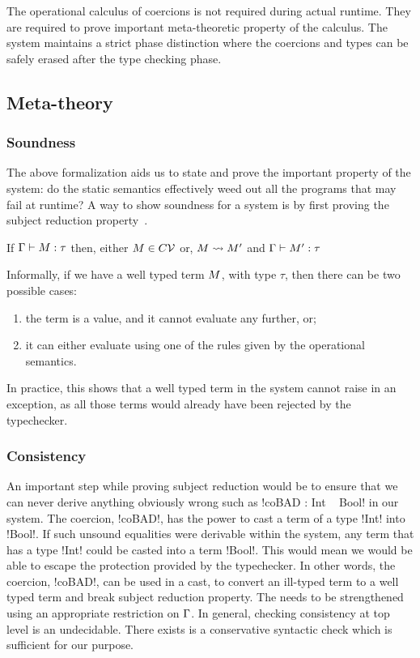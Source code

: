 \documentclass[screen,nonacm,manuscript,review]{acmart} %
\begin{document}
The operational calculus of coercions is not required during
actual runtime. They are required to prove important
meta-theoretic property of the calculus. The system maintains a strict
phase distinction where the coercions and types can be safely erased
after the type checking phase.

\subsection{Meta-theory}
\subsubsection{Soundness}
The above formalization aids us to state and prove
the important property of the system: do the static semantics
effectively weed out all the programs that may fail at runtime?
A way to show soundness for a system is by first proving the subject
reduction property~\cite{wright_syntactic_1994}.

\begin{claim}\label{claim:sfc-ty-safety}
 If $\Gamma \vdash M : \tau$ then, either $M \in C\mathcal{V}$ or, $M \rightsquigarrow M'$ and
 $\Gamma \vdash M' : \tau$
\end{claim}

Informally, if we have a well typed term $M$, with type $\tau$, then
there can be two possible cases:
\begin{enumerate}
\item the term is a value, and it cannot evaluate any further, or;
\item it can either evaluate using one of the rules given by the
  operational semantics.
\end{enumerate}
In practice, this shows that a well typed term in the system
cannot raise in an exception, as all those terms would already have
been rejected by the typechecker.

\subsubsection{Consistency}
An important step while proving subject reduction would be to ensure that we
can never derive anything obviously wrong such as !coBAD : Int ~ Bool!
in our system. The coercion, !coBAD!, has the power to cast a term of
a type !Int! into !Bool!. If such unsound equalities were
derivable within the system, any term that has a type !Int! could be
casted into a term !Bool!. This would mean we would be able to escape
the protection provided by the typechecker. In other words, the
coercion, !coBAD!, can be used in a cast, to convert an ill-typed term
to a well typed term and break subject reduction property. The
 needs to be strengthened using an
appropriate restriction on $\Gamma$. In general, checking consistency
at top level is an undecidable. There exists is a conservative
syntactic check which is sufficient for our purpose.
\end{document}
